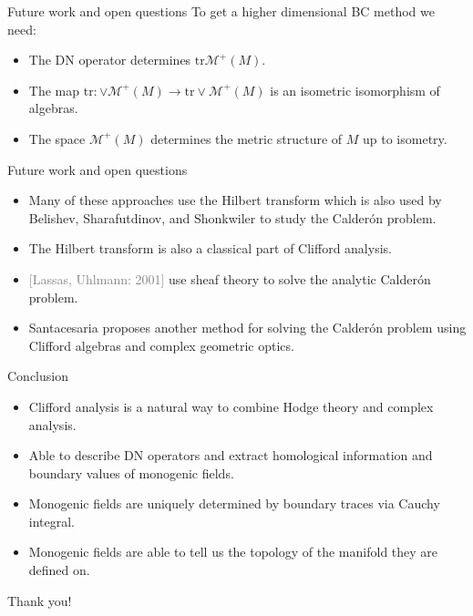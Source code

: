 \documentclass[aspectratio=169,handout]{beamer}
\newcommand\grey[1]{\textcolor{gray}{#1}}
\newcommand{\trace}{\mathrm{tr}}
\newcommand{\monogenics}{\mathcal{M}}
\begin{document}
\begin{frame}{Future work and open questions}
\vfill
To get a higher dimensional BC method we need:
\begin{itemize}
  \item The DN operator determines $\trace \monogenics^+(M)$.
  \item The map $\trace \colon \vee \monogenics^+(M) \to \trace \vee \monogenics^+(M)$ is an isometric isomorphism of algebras.
  \item The space $\monogenics^+(M)$ determines the metric structure of $M$ up to isometry.
\end{itemize}
\vfill
\end{frame}


\begin{frame}{Future work and open questions}
\vfill
\begin{itemize}
  \item Many of these approaches use the Hilbert transform which is also used by Belishev, Sharafutdinov, and Shonkwiler to study the Calder\'on problem.
  \item The Hilbert transform is also a classical part of Clifford analysis.
  \item \grey{[Lassas, Uhlmann: 2001]} use sheaf theory to solve the analytic Calder\'on problem.
  \item Santacesaria proposes another method for solving the Calder\'on problem using Clifford algebras and complex geometric optics.
\end{itemize}
\vfill
\end{frame}


\begin{frame}{Conclusion}
\vfill
\begin{itemize}
\pause
    \item Clifford analysis is a natural way to combine Hodge theory and complex analysis.
\pause
    \item Able to describe DN operators and extract homological information and boundary values of monogenic fields.
\pause
  \item Monogenic fields are uniquely determined by boundary traces via Cauchy integral.
\pause
    \item Monogenic fields are able to tell us the topology of the manifold they are defined on.
\end{itemize}
\vfill
\end{frame}


\begin{frame}{}
\vfill
\begin{center}
\large Thank you!
\end{center}
\vfill
\end{frame}
\end{document}
